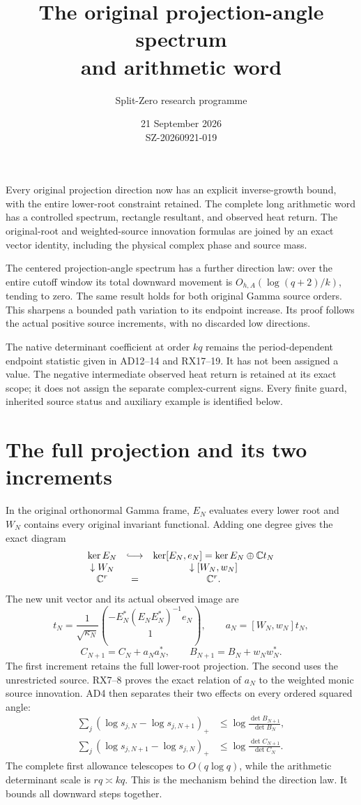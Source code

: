 \documentclass[11pt]{article}
\title{The original projection-angle spectrum\\and arithmetic word}
\author{Split-Zero research programme}
\date{21 September 2026\\SZ-20260921-019}
\begin{document}
\maketitle
Every original projection direction now has an explicit inverse-growth
bound, with the entire lower-root constraint retained. The complete
long arithmetic word has a controlled spectrum, rectangle resultant,
and observed heat return. The original-root and weighted-source
innovation formulas are joined by an exact vector identity, including
the physical complex phase and source mass.

The centered projection-angle spectrum has a further direction law:
over the entire cutoff window its total downward movement is
$O_{h,A}(\log(q+2)/k)$, tending to zero. The same result holds for
both original Gamma source orders. This sharpens a bounded path
variation to its endpoint increase. Its proof follows the actual
positive source increments, with no discarded low directions.

The native determinant coefficient at order $kq$ remains the
period-dependent endpoint statistic given in AD12--14 and RX17--19.
It has not been assigned a value. The negative intermediate observed
heat return is retained at its exact scope; it does not assign the
separate complex-current signs. Every finite guard, inherited source
status and auxiliary example is identified below.
\begingroup\small\tableofcontents\endgroup\clearpage
\section*{The full projection and its two increments}
In the original orthonormal Gamma frame, $E_N$ evaluates every lower
root and $W_N$ contains every original invariant functional. Adding
one degree gives the exact diagram
\[
\begin{array}{ccc}
\ker E_N&\lhook\joinrel\longrightarrow&\ker[E_N,e_N]
=\ker E_N\oplus\mathbb Ct_N\\
\downarrow W_N&&\downarrow[W_N,w_N]\\
\mathbb C^r&=&\mathbb C^r.
\end{array}
\]
The new unit vector and its actual observed image are
\[
t_N=\frac1{\sqrt{\kappa_N}}
\binom{-E_N^*(E_NE_N^*)^{-1}e_N}{1},\qquad
a_N=[W_N,w_N]t_N,
\]
\[
C_{N+1}=C_N+a_Na_N^*,\qquad
B_{N+1}=B_N+w_Nw_N^*.
\]
The first increment retains the full lower-root projection. The second
uses the unrestricted source. RX7--8 proves the exact relation of $a_N$
to the weighted monic source innovation. AD4 then separates their two
effects on every ordered squared angle:
\[
\begin{aligned}
\sum_j(\log s_{j,N}-\log s_{j,N+1})_+
&\le\log\frac{\det B_{N+1}}{\det B_N},\\
\sum_j(\log s_{j,N+1}-\log s_{j,N})_+
&\le\log\frac{\det C_{N+1}}{\det C_N}.
\end{aligned}
\]
The complete first allowance telescopes to $O(q\log q)$, while the
arithmetic determinant scale is $rq\asymp kq$. This is the mechanism
behind the direction law. It bounds all downward steps together.
\end{document}
